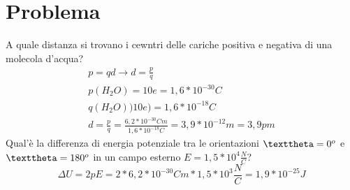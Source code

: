 \section{Problema}
\begin{tasks}
  \task A quale distanza si trovano i cewntri delle cariche positiva e negativa di una molecola d'acqua?
  \begin{eqnarray*}
    p=qd\to d=\frac{p}{q}\\
    p(H_2O)=10e=1,6*10^{-30}C\\
    q(H_2O))10e)=1,6*10^{-18}C\\
    d=\frac{p}{q}=\frac{6,2*10^{-30}Cm}{1,6*10^{-18}C}=3,9*10^{-12}m=3,9pm
  \end{eqnarray*}
  \task Qual'è la differenza di energia potenziale tra le orientazioni $\texttheta=0^o$ e $\texttheta=180^o$ in un campo esterno $E=1,5*10^4\frac{N}{C}$?
  \begin{equation}
	\Delta U=2pE=2*6,2*10^{-30}Cm*1,5*10^3\frac{N}{C}=1,9*10^{-25}J
  \end{equation}
\end{tasks}
